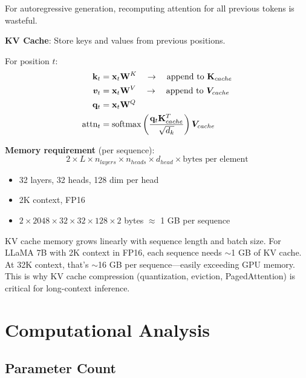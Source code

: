 For autoregressive generation, recomputing attention for all previous tokens is wasteful.

\textbf{KV Cache}: Store keys and values from previous positions.

For position $t$:
\begin{align}
\mathbf{k}_t &= \mathbf{x}_t \mathbf{W}^K \quad \to \quad \text{append to } \mathbf{K}_{cache} \\
\bm{v}_t &= \mathbf{x}_t \mathbf{W}^V \quad \to \quad \text{append to } \bm{V}_{cache} \\
\mathbf{q}_t &= \mathbf{x}_t \mathbf{W}^Q \\
\text{attn}_t &= \operatorname{softmax}\left(\frac{\mathbf{q}_t \mathbf{K}_{cache}^T}{\sqrt{d_k}}\right) \bm{V}_{cache}
\end{align}

\textbf{Memory requirement} (per sequence):
\begin{equation}
2 \times L \times n_{layers} \times n_{heads} \times d_{head} \times \text{bytes per element}
\end{equation}

\begin{example}
\begin{itemize}
    \item 32 layers, 32 heads, 128 dim per head
    \item 2K context, FP16
    \item $2 \times 2048 \times 32 \times 32 \times 128 \times 2$ bytes $\approx$ 1 GB per sequence
\end{itemize}
\end{example}

\begin{warningbox}
KV cache memory grows linearly with sequence length and batch size. For LLaMA 7B with 2K context in FP16, each sequence needs $\sim$1 GB of KV cache. At 32K context, that's $\sim$16 GB per sequence---easily exceeding GPU memory. This is why KV cache compression (quantization, eviction, PagedAttention) is critical for long-context inference.
\end{warningbox}

\section{Computational Analysis}
\label{sec:transformer_compute}

\subsection{Parameter Count}

